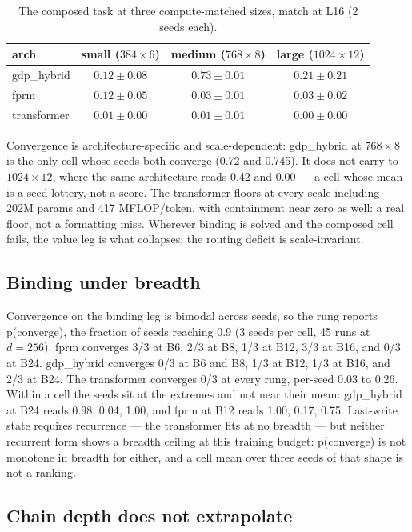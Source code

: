 \documentclass[11pt]{article}
\begin{document}
\begin{table}[h]
\centering
\begin{tabular}{lccc}
\toprule
arch & small ($384\times6$) & medium ($768\times8$) & large ($1024\times12$) \\
\midrule
gdp\_hybrid & $0.12 \pm 0.08$ & $0.73 \pm 0.01$ & $0.21 \pm 0.21$ \\
fprm & $0.12 \pm 0.05$ & $0.03 \pm 0.01$ & $0.03 \pm 0.02$ \\
transformer & $0.01 \pm 0.00$ & $0.01 \pm 0.01$ & $0.00 \pm 0.00$ \\
\bottomrule
\end{tabular}
\caption{The composed task at three compute-matched sizes, match at L16 (2 seeds each).}
\label{tab:scale}
\end{table}

Convergence is architecture-specific and scale-dependent: gdp\_hybrid at $768\times8$ is the
only cell whose seeds both converge (0.72 and 0.745). It does not carry to $1024\times12$,
where the same architecture reads 0.42 and 0.00 --- a cell whose mean is a seed lottery, not
a score. The transformer floors at every scale including 202M
params and 417 MFLOP/token, with containment near zero as well: a real floor, not a formatting
miss. Wherever binding is solved and the composed cell fails, the value leg is what collapses;
the routing deficit is scale-invariant.

\subsection{Binding under breadth}

Convergence on the binding leg is bimodal across seeds, so the rung reports p(converge), the
fraction of seeds reaching 0.9 (3 seeds per cell, 45 runs at $d=256$). fprm converges 3/3 at
B6, 2/3 at B8, 1/3 at B12, 3/3 at B16, and 0/3 at B24. gdp\_hybrid converges 0/3 at B6 and B8,
1/3 at B12, 1/3 at B16, and 2/3 at B24. The transformer converges 0/3 at every rung, per-seed
0.03 to 0.26. Within a cell the seeds sit at the extremes and not near their mean: gdp\_hybrid
at B24 reads 0.98, 0.04, 1.00, and fprm at B12 reads 1.00, 0.17, 0.75. Last-write state
requires recurrence --- the transformer fits at no breadth --- but neither recurrent form shows
a breadth ceiling at this training budget: p(converge) is not monotone in breadth for either,
and a cell mean over three seeds of that shape is not a ranking.

\subsection{Chain depth does not extrapolate}
\end{document}
